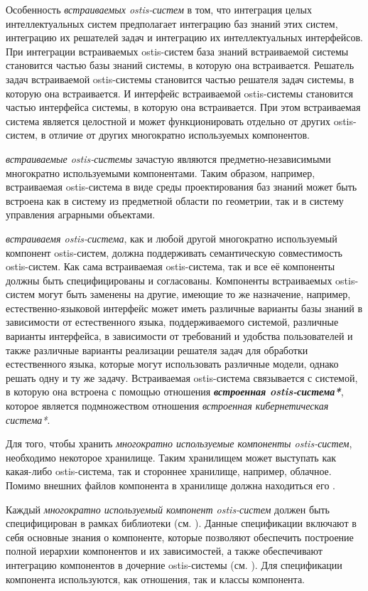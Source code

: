 Особенность \textit{встраиваемых ostis-систем} в том, что интеграция целых интеллектуальных систем предполагает интеграцию баз знаний этих систем, интеграцию их решателей задач и интеграцию их интеллектуальных интерфейсов. При интеграции встраиваемых ostis-систем база знаний встраиваемой системы становится частью базы знаний системы, в которую она встраивается. Решатель задач встраиваемой ostis-системы становится частью решателя задач системы, в которую она встраивается. И интерфейс встраиваемой ostis-системы становится частью интерфейса системы, в которую она встраивается. При этом встраиваемая система является целостной и может функционировать отдельно от других ostis-систем, в отличие от других многократно используемых компонентов.

\textit{встраиваемые ostis-системы} зачастую являются предметно-независимыми многократно используемыми компонентами. Таким образом, например, встраиваемая ostis-система в виде среды проектирования баз знаний может быть встроена как в систему из предметной области по геометрии, так и в систему управления аграрными объектами.

\textit{встраиваемя ostis-система}, как и любой другой многократно используемый компонент ostis-систем, должна поддерживать семантическую совместимость ostis-систем. Как сама встраиваемая ostis-система, так и все её компоненты должны быть специфицированы и согласованы. Компоненты встраиваемых ostis-систем могут быть заменены на другие, имеющие то же назначение, например, естественно-языковой интерфейс может иметь различные варианты базы знаний в зависимости от естественного языка, поддерживаемого системой, различные варианты интерфейса, в зависимости от требований и удобства пользователей и также различные варианты реализации решателя задач для обработки естественного языка, которые могут использовать различные модели, однако решать одну и ту же задачу. Встраиваемая ostis-система связывается с системой, в которую она встроена с помощью отношения \textbf{\textit{встроенная ostis-система*}}, которое является подмножеством отношения \textit{встроенная кибернетическая система*}.

Для того, чтобы хранить \textit{многократно используемые компоненты ostis-систем}, необходимо некоторое хранилище. Таким хранилищем может выступать как какая-либо ostis-система, так и стороннее хранилище, например, облачное. Помимо внешних файлов компонента в хранилище должна находиться его .

Каждый \textit{многократно используемый компонент ostis-систем} должен быть специфицирован в рамках библиотеки (см. ). Данные спецификации включают в себя основные знания о компоненте, которые позволяют обеспечить построение полной иерархии компонентов и их зависимостей, а также обеспечивают  интеграцию компонентов в дочерние ostis-системы (см. ). Для спецификации компонента используются, как отношения, так и классы компонента.

